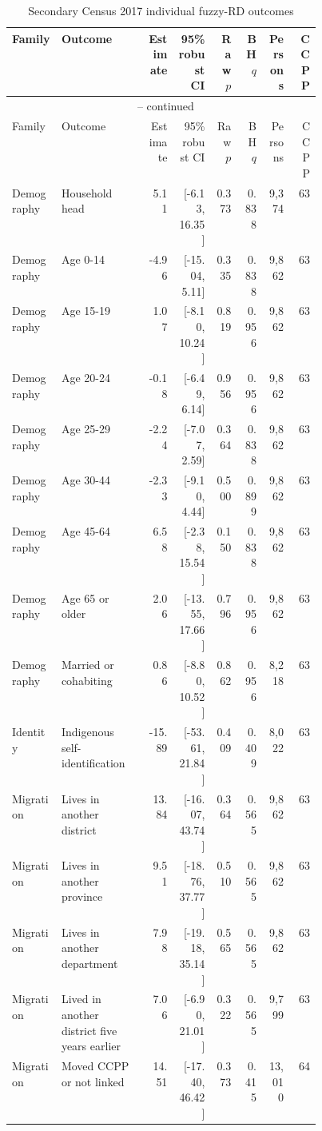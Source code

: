 \begingroup
\scriptsize
\begin{longtable}{p{0.16\linewidth}p{0.29\linewidth}rrrrrr}
\caption{Secondary Census 2017 individual fuzzy-RD outcomes}
\label{tab:rd_outcomes_secondary_2017_individual} \\
\toprule
Family & Outcome & Estimate & 95\% robust CI & Raw \(p\) & BH \(q\) & Persons & CCPP \\
\midrule
\endfirsthead
\multicolumn{8}{c}{\tablename\ \thetable{} -- continued} \\
\toprule
Family & Outcome & Estimate & 95\% robust CI & Raw \(p\) & BH \(q\) & Persons & CCPP \\
\midrule
\endhead
Demography & Household head & 5.11 & [-6.13, 16.35] & 0.373 & 0.838 & 9,374 & 63 \\
Demography & Age 0-14 & -4.96 & [-15.04, 5.11] & 0.335 & 0.838 & 9,862 & 63 \\
Demography & Age 15-19 & 1.07 & [-8.10, 10.24] & 0.819 & 0.956 & 9,862 & 63 \\
Demography & Age 20-24 & -0.18 & [-6.49, 6.14] & 0.956 & 0.956 & 9,862 & 63 \\
Demography & Age 25-29 & -2.24 & [-7.07, 2.59] & 0.364 & 0.838 & 9,862 & 63 \\
Demography & Age 30-44 & -2.33 & [-9.10, 4.44] & 0.500 & 0.899 & 9,862 & 63 \\
Demography & Age 45-64 & 6.58 & [-2.38, 15.54] & 0.150 & 0.838 & 9,862 & 63 \\
Demography & Age 65 or older & 2.06 & [-13.55, 17.66] & 0.796 & 0.956 & 9,862 & 63 \\
Demography & Married or cohabiting & 0.86 & [-8.80, 10.52] & 0.862 & 0.956 & 8,218 & 63 \\
Identity & Indigenous self-identification & -15.89 & [-53.61, 21.84] & 0.409 & 0.409 & 8,022 & 63 \\
Migration & Lives in another district & 13.84 & [-16.07, 43.74] & 0.364 & 0.565 & 9,862 & 63 \\
Migration & Lives in another province & 9.51 & [-18.76, 37.77] & 0.510 & 0.565 & 9,862 & 63 \\
Migration & Lives in another department & 7.98 & [-19.18, 35.14] & 0.565 & 0.565 & 9,862 & 63 \\
Migration & Lived in another district five years earlier & 7.06 & [-6.90, 21.01] & 0.322 & 0.565 & 9,799 & 63 \\
Migration & Moved CCPP or not linked & 14.51 & [-17.40, 46.42] & 0.373 & 0.415 & 13,010 & 64 \\

\end{longtable}
